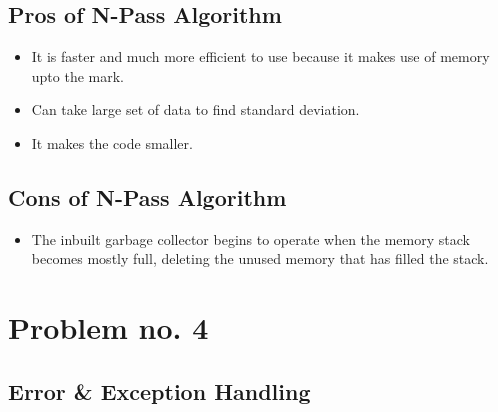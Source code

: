 \documentclass[12pt,a4paper]{report}
\begin{document}
\section*{Pros of N-Pass Algorithm}
\begin{itemize}
        \item It is faster and much more efficient to use because it makes use of memory upto the mark. 
        \item Can take large set of data to find standard deviation.
        \item It makes the code smaller.

\end{itemize}
\section*{Cons of N-Pass Algorithm}
\begin{itemize}
        \item The inbuilt garbage collector begins to operate when the memory stack becomes mostly full, deleting the unused memory that has filled the stack.
\end{itemize}

\chapter{Problem no. 4}
\section{Error \& Exception Handling}
\end{document}
